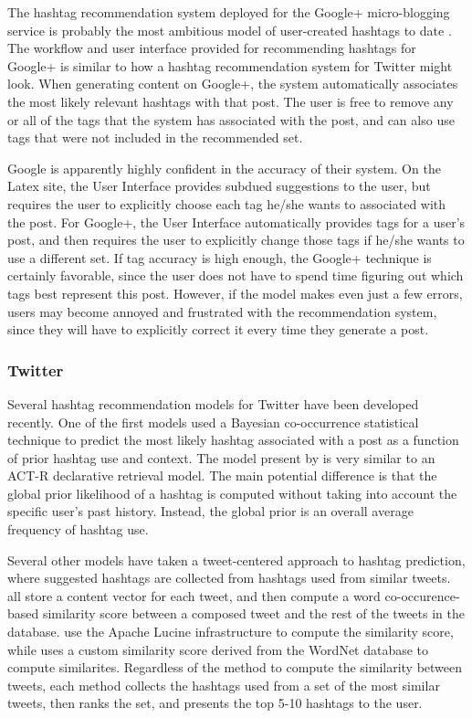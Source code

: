 \documentclass[man,floatsintext]{apa6}
\begin{document}
The hashtag recommendation system deployed for the Google+ micro-blogging service is probably the most ambitious model of user-created hashtags to date \parencite{GoogleKeynote2013}.
The workflow and user interface provided for recommending hashtags for Google+ is similar to how a hashtag recommendation system for Twitter might look.
When generating content on Google+, the system automatically associates the most likely relevant hashtags with that post.
The user is free to remove any or all of the tags that the system has associated with the post, and can also use tags that were not included in the recommended set.

Google is apparently highly confident in the accuracy of their system.
On the Latex site, the User Interface provides subdued suggestions to the user, but requires the user to explicitly choose each tag he/she wants to associated with the post.
For Google+, the User Interface automatically provides tags for a user's post, and then requires the user to explicitly change those tags if he/she wants to use a different set.
If tag accuracy is high enough, the Google+ technique is certainly favorable, since the user does not have to spend time figuring out which tags best represent this post.
However, if the model makes even just a few errors, users may become annoyed and frustrated with the recommendation system, since they will have to explicitly correct it every time they generate a post.

\subsubsection{Twitter}

Several hashtag recommendation models for Twitter have been developed recently.
One of the first models used a Bayesian co-occurrence statistical technique to predict the most likely hashtag associated with a post as a function of prior hashtag use and context. \parencite{Mazzia2009}
The model present by \textcite{Mazzia2009} is very similar to an ACT-R declarative retrieval model.
The main potential difference is that the global prior likelihood of a hashtag is computed without taking into account the specific user's past history.
Instead, the global prior is an overall average frequency of hashtag use.

Several other models have taken a tweet-centered approach to hashtag prediction, where suggested hashtags are collected from hashtags used from similar tweets.
\textcites{Li2011, Zangerle2011, Kywe2012} all store a content vector for each tweet, and then compute a word co-occurence-based similarity score between a composed tweet and the rest of the tweets in the database.
\textcites{Zangerle2011, Kywe2012} use the Apache Lucine infrastructure to compute the similarity score, while \textcite{Li2011} uses a custom similarity score derived from the WordNet database to compute similarites.
Regardless of the method to compute the similarity between tweets, each method collects the hashtags used from a set of the most similar tweets, then ranks the set, and presents the top 5-10 hashtags to the user.
\end{document}
